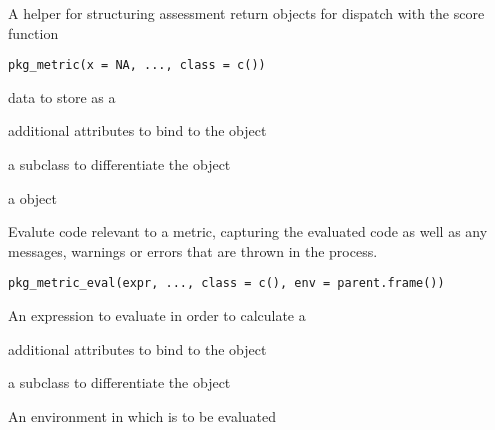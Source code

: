 \documentclass[a4paper]{book}
\begin{document}
%
\begin{Description}
A helper for structuring assessment return objects for dispatch with the
score function
\end{Description}
%
\begin{Usage}
\begin{verbatim}
pkg_metric(x = NA, ..., class = c())
\end{verbatim}
\end{Usage}
%
\begin{Arguments}
\begin{ldescription}
\item[\code{x}] data to store as a 

\item[\code{...}] additional attributes to bind to the  object

\item[\code{class}] a subclass to differentiate the  object
\end{ldescription}
\end{Arguments}
%
\begin{Value}
a  object
\end{Value}
%
\begin{Description}
Evalute code relevant to a metric, capturing the evaluated code as well as
any messages, warnings or errors that are thrown in the process.
\end{Description}
%
\begin{Usage}
\begin{verbatim}
pkg_metric_eval(expr, ..., class = c(), env = parent.frame())
\end{verbatim}
\end{Usage}
%
\begin{Arguments}
\begin{ldescription}
\item[\code{expr}] An expression to evaluate in order to calculate a

\item[\code{...}] additional attributes to bind to the  object

\item[\code{class}] a subclass to differentiate the  object

\item[\code{env}] An environment in which  is to be evaluated
\end{ldescription}
\end{Arguments}
\end{document}
